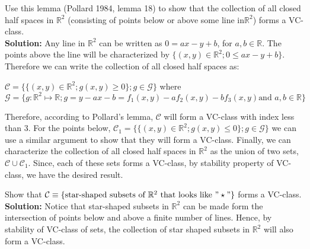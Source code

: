 \documentclass[11pt,letterpaper]{article}                  %
\begin{document}
\bigskip
\begin{problem} Use this lemma (Pollard 1984, lemma 18) to show that the collection of all closed half spaces in $\mathbb{R}^2$ (consisting of points below or above some line in$\mathbb{R}^2$) forms a VC-class.\\

\textbf{Solution:} Any line in $\mathbb{R}^2$ can be written as $0=ax-y+b$, for $a,b \in \mathbb{R}$. The points above the line will be characterized by $\{(x,y)\in \mathbb{R}^2; 0\leq ax-y+b\}$. Therefore we can write the collection of all closed half spaces as:
\begin{center}
$\mathcal{C}=\{\{(x,y)\in \mathbb{R}^2; g(x,y)\geq 0\}; g \in \mathcal{G}\}$ where \\
$\mathcal{G}=\{g:\mathbb{R}^2\mapsto \mathbb{R}; g= y-ax-b = f_1(x,y) - a f_2(x,y) - bf_3(x,y) \text{and } a,b \in \mathbb{R}\}$
\end{center}
Therefore, according to Pollard's lemma, $\mathcal{C}$ will form a VC-class with index less than 3. For the points below, $\mathcal{C}_1=\{\{(x,y)\in \mathbb{R}^2; g(x,y)\leq 0\}; g \in \mathcal{G}\}$ we can use a similar argument to show that they will form a VC-class. Finally, we can characterize the collection of all closed half spaces in $\mathbb{R}^2$ as the union of two sets, $\mathcal{C} \cup \mathcal{C}_1$. Since, each of these sets forms a VC-class, by stability property of VC-class, we have the desired result. 
\end{problem}

\bigskip
\begin{problem} Show that $\mathcal{C}\equiv \{\text{star-shaped subsets of } \mathbb{R}^2 \ \text{that looks like } "\star" \}$ forms a VC-class.\\

\textbf{Solution:} Notice that star-shaped subsets in $\mathbb{R}^2$ can be made form the intersection of points below and above a finite number of lines. Hence, by stability of VC-class of sets, the collection of star shaped subsets in $\mathbb{R}^2$ will also form a VC-class.
\end{problem}
\end{document}

